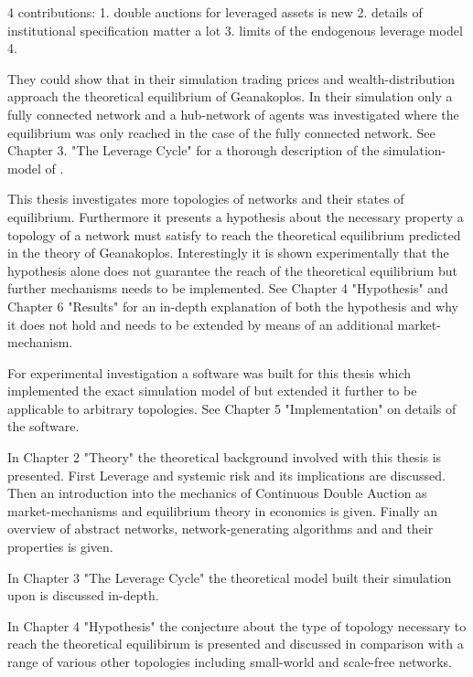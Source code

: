\documentclass[Bachelorarbeit.tex]{subfiles}
\begin{document}
4 contributions:
1. double auctions for leveraged assets is new
2. details of institutional specification matter a lot
3. limits of the endogenous leverage model
4. 

They could show that in their simulation trading prices and wealth-distribution approach the theoretical equilibrium of Geanakoplos.
In their simulation only a fully connected network and a hub-network of agents was investigated where the equilibrium was only reached in the case of the fully connected network. See Chapter 3. "The Leverage Cycle" for a thorough description of the simulation-model of \cite{Breuer2015}. 

\thinspace

This thesis investigates more topologies of networks and their states of equilibrium. Furthermore it presents a hypothesis about the necessary property a topology of a network must satisfy to reach the theoretical equilibrium predicted in the theory of Geanakoplos. 
Interestingly it is shown experimentally that the hypothesis alone does not guarantee
the reach of the theoretical equilibrium but further mechanisms needs to be implemented.
See Chapter 4 "Hypothesis" and Chapter 6 "Results" for an in-depth explanation of both the hypothesis and why it does not hold and needs to be extended by means of an additional market-mechanism.

\thinspace

For experimental investigation a software was built for this thesis which 
implemented the exact simulation model of \cite{Breuer2015} but extended it further to be 
applicable to arbitrary topologies. See Chapter 5 "Implementation" on details of the software.

\bigskip

In Chapter 2 "Theory" the theoretical background involved with this thesis is presented. First Leverage and systemic risk and its implications are discussed. Then an introduction into the mechanics of Continuous Double Auction as market-mechanisms and equilibrium theory in economics is given. Finally an overview of abstract networks, network-generating algorithms and and their properties is given.

\bigskip

In Chapter 3 "The Leverage Cycle" the theoretical model \cite{Breuer2015} built their simulation upon is discussed in-depth.

\bigskip

In Chapter 4 "Hypothesis" the conjecture about the type of topology necessary to reach the theoretical equilibirum is presented and discussed in comparison with a range of various other topologies including small-world and scale-free networks.
\end{document}
